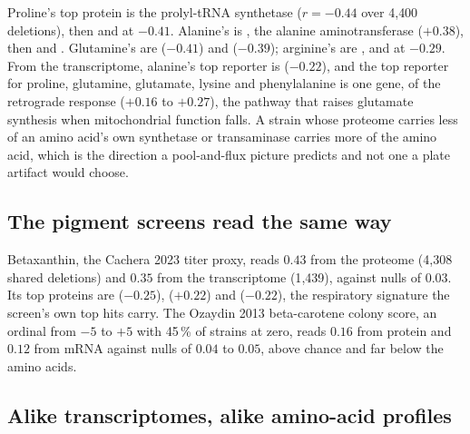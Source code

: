 

 Proline's top
protein is the prolyl-tRNA synthetase  ($r = -0.44$ over 4{,}400
deletions), then  and  at $-0.41$. Alanine's is , the
alanine aminotransferase ($+0.38$), then  and . Glutamine's are
 ($-0.41$) and  ($-0.39$); arginine's are ,
 and  at $-0.29$. From the transcriptome, alanine's top reporter
is  ($-0.22$), and the top reporter for proline, glutamine, glutamate, lysine
and phenylalanine is one gene,  of the retrograde response ($+0.16$ to
$+0.27$), the pathway that raises glutamate synthesis when mitochondrial function
falls. A strain whose proteome carries less of an amino acid's own
synthetase or transaminase carries more of the amino acid, which is the direction a
pool-and-flux picture predicts and not one a plate artifact would choose.

\subsection{The pigment screens read the same way}
\label{sec:findings-pigment}

Betaxanthin, the Cachera 2023 titer proxy, reads $0.43$ from the proteome (4{,}308
shared deletions) and $0.35$ from the transcriptome (1{,}439), against nulls of $0.03$.
Its top proteins are  ($-0.25$),  ($+0.22$) and 
($-0.22$), the respiratory signature the screen's own top hits carry. The Ozaydin 2013
beta-carotene colony score, an ordinal from $-5$ to $+5$ with 45\,\% of strains at zero,
reads $0.16$ from protein and $0.12$ from mRNA against nulls of $0.04$ to $0.05$, above
chance and far below the amino acids.

\subsection{Alike transcriptomes, alike amino-acid profiles}
\label{sec:findings-structure}

